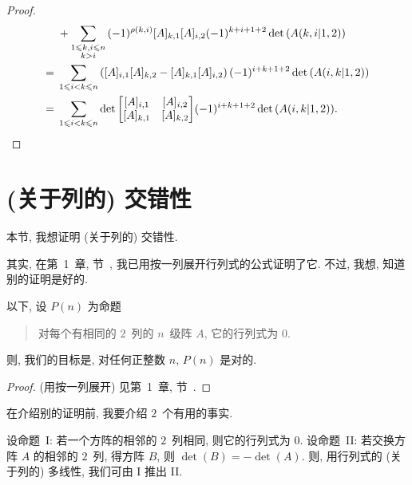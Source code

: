 \documentclass[../libro.tex]{subfiles}
\begin{document}
\begin{proof}
\begin{align*}
        &
        +
        \sum_{\substack{1 \leq k,i \leq n \\ k > i}}
        {(-1)^{\rho(k,i)}
            [A]_{k,1} [A]_{i,2}
            (-1)^{k+i+1+2}
        \det {(A(k,i|1,2))}}
        \\
        = {} &
        \sum_{1 \leq i < k \leq n}
        {([A]_{i,1} [A]_{k,2} - [A]_{k,1} [A]_{i,2})\,
            (-1)^{i+k+1+2}
        \det {(A(i,k|1,2))}}
        \\
        = {} &
        \sum_{1 \leq i < k \leq n}
        {\det {
                \begin{bmatrix}
                    [A]_{i,1} & [A]_{i,2} \\
                    [A]_{k,1} & [A]_{k,2} \\
                \end{bmatrix}
            }
            (-1)^{i+k+1+2}
        \det {(A(i,k|1,2))}}.
        \qedhere
    \end{align*}
\end{proof}

\section{(关于列的) 交错性}

本节, 我想证明 (关于列的) 交错性.

其实, 在第~1~章, 节~,
我已用按一列展开行列式的公式证明了它.
不过, 我想, 知道别的证明是好的.

以下, 设 \(P(n)\) 为命题
\begin{quotation}
    对每个有相同的 \(2\)~列的 \(n\)~级阵 \(A\),
    它的行列式为 \(0\).
\end{quotation}
则, 我们的目标是,
对任何正整数 \(n\), \(P(n)\) 是对的.

\begin{proof}
    (用按一列展开)
    见第~1~章, 节~.
\end{proof}

在介绍别的证明前, 我要介绍 \(2\)~个有用的事实.

\begin{theorem}
    设命题~I:
    若一个方阵的相邻的 \(2\)~列相同, 则它的行列式为 \(0\).
    设命题~II:
    若交换方阵 \(A\) 的相邻的 \(2\)~列, 得方阵 \(B\),
    则 \(\det {(B)} = -\det {(A)}\).
    则, 用行列式的 (关于列的) 多线性,
    我们可由 I 推出 II.
\end{theorem}
\end{document}
